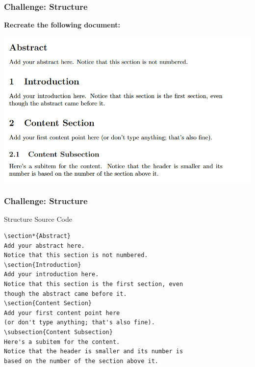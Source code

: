 \begin{frame}[fragile]
\frametitle{Challenge: Structure}
\begin{center}
\textbf{Recreate the following document:} \\
\end{center}
\includegraphics[width=0.9\linewidth]{img/structure_challenge.png}
\end{frame}


\begin{frame}[fragile]
\frametitle{Challenge: Structure}
\begin{alertblock}{Structure Source Code}
\small
\begin{verbatim}
\section*{Abstract}
Add your abstract here. 
Notice that this section is not numbered. 
\section{Introduction}
Add your introduction here. 
Notice that this section is the first section, even 
though the abstract came before it.
\section{Content Section}
Add your first content point here 
(or don't type anything; that's also fine).
\subsection{Content Subsection}
Here's a subitem for the content. 
Notice that the header is smaller and its number is 
based on the number of the section above it.
\end{verbatim}
\end{alertblock}    
\end{frame}


